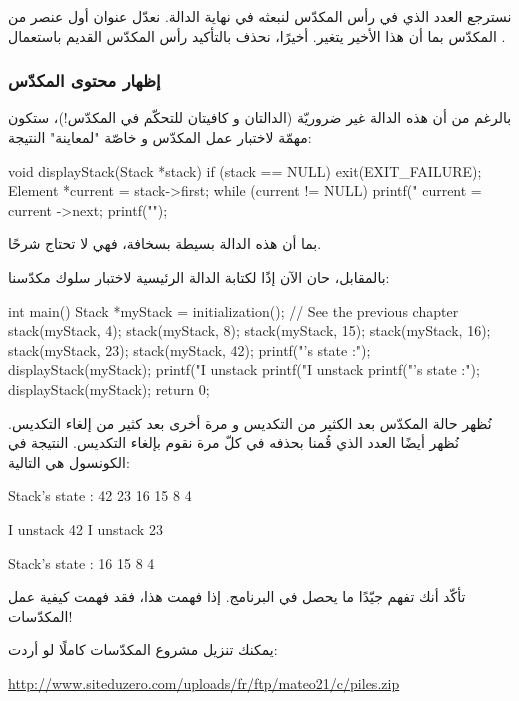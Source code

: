 نسترجع العدد الذي في رأس المكدّس لنبعثه في نهاية الدالة. نعدّل عنوان أول عنصر من المكدّس بما أن هذا الأخير يتغير.
أخيرًا، نحذف بالتأكيد رأس المكدّس القديم باستعمال
.

\subsubsection{إظهار محتوى المكدّس}

بالرغم من أن هذه الدالة غير ضروريّة (الدالتان
و 
كافيتان للتحكّم في المكدّس!)، ستكون مهمّة لاختبار عمل المكدّس و خاصّة "لمعاينة" النتيجة:

\begin{Csource}
void displayStack(Stack *stack)
{
	if (stack == NULL)
	{
		exit(EXIT_FAILURE);
	}
	Element *current = stack->first;
	while (current != NULL)
	{
		printf("%
		current = current ->next;
	}
	printf("\n");
}
\end{Csource}

بما أن هذه الدالة بسيطة بسخافة، فهي لا تحتاج شرحًا.

بالمقابل، حان الآن إذًا لكتابة الدالة الرئيسية لاختبار سلوك مكدّسنا:

\begin{Csource}
int main()
{
	Stack *myStack = initialization(); // See the previous chapter
	stack(myStack, 4);
	stack(myStack, 8);
	stack(myStack, 15);
	stack(myStack, 16);
	stack(myStack, 23);
	stack(myStack, 42);
	printf("\nStack's state :\n");
	displayStack(myStack);
	printf("I unstack %
	printf("I unstack %
	printf("\nStack's state :\n");
	displayStack(myStack);
	return 0;
}
\end{Csource}

نُظهر حالة المكدّس بعد الكثير من التكديس و مرة أخرى بعد كثير من إلغاء التكديس. نُظهر أيضًا العدد الذي قُمنا بحذفه في كلّ مرة نقوم بإلغاء التكديس. النتيجة في الكونسول هي التالية:

\begin{Console}
Stack's state :
42
23
16
15
8
4

I unstack 42
I unstack 23

Stack's state :
16
15
8
4
\end{Console}

تأكّد أنك تفهم جيّدًا ما يحصل في البرنامج. إذا فهمت هذا، فقد فهمت كيفية عمل المكدّسات!

يمكنك تنزيل مشروع المكدّسات كاملًا لو أردت:

\url{http://www.siteduzero.com/uploads/fr/ftp/mateo21/c/piles.zip}

